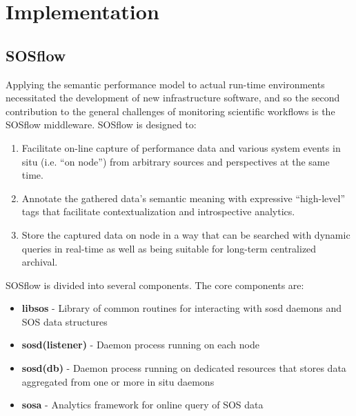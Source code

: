 
\section{Implementation}


\subsection{SOSflow}
Applying the semantic performance model to actual run-time
environments necessitated the development of new infrastructure
software, and so the second contribution to the general challenges of
monitoring scientific workflows is the SOSflow middleware.
%
SOSflow is designed to:
%
\begin{enumerate}
    \item Facilitate on-line capture of performance data and various system
      events in situ (i.e. ``on node'') from arbitrary sources and
      perspectives at the same time.
    \item Annotate the gathered data's semantic meaning with
      expressive ``high-level'' tags that facilitate contextualization
      and introspective analytics.
    \item Store the captured data on node in a way that can be
      searched with dynamic queries in real-time as well as being
      suitable for long-term centralized archival.
\end{enumerate}

SOSflow is divided into several components.  The core components are:
%
\begin{itemize}
    \item \textbf{libsos} - Library of common routines for interacting with
      sosd daemons and SOS data structures
    \item \textbf{sosd(listener)} - Daemon process running on each node
    \item \textbf{sosd(db)} - Daemon process running on dedicated resources
      that stores data aggregated from one or more in situ daemons
    \item \textbf{sosa} - Analytics framework for online query of SOS data
\end{itemize}

